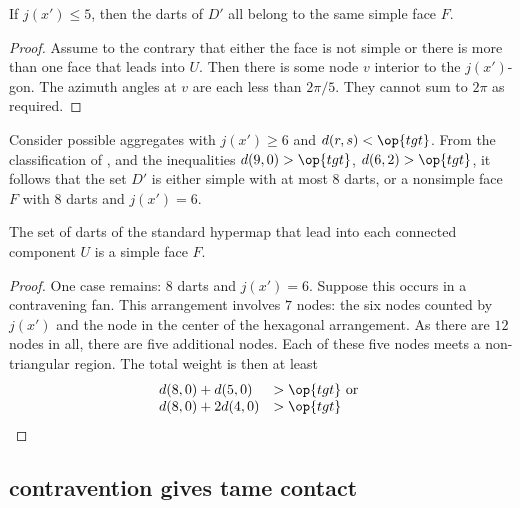 \begin{lemma}[]\label{lemma:DU} If $j(x')\le 5$, then the
  darts of $D'$ all belong to the same simple face $F$.
\end{lemma}
%

\begin{proof} Assume to the contrary that either the face is not
  simple or there is more than one face that leads into $U$.  Then
  there is some node $v$ interior to the $j(x')$-gon.  The azimuth
  angles at $v$ are each less than $2\pi/5$. They cannot sum to $2\pi$
  as required.
\end{proof}

Consider possible aggregates with $j(x')\ge 6$ and $d(r,s)<\op{tgt}$.
From the classification of \cite[p.~126,~Fig.~12.1]{Hales:2006:DCG},
and the inequalities $d(9,0) > \op{tgt}$, $d(6,2) > \op{tgt}$, it
follows that the set $D'$ is either simple with at most $8$ darts, or
a nonsimple face $F$ with $8$ darts and $j(x')=6$.

\begin{lemma}[]\label{lemma:simple} The set of darts of
  the standard hypermap that lead into each connected component $U$ is
  a simple face $F$.
\end{lemma}
%
%

\begin{proof} One case remains: $8$ darts and $j(x')=6$.  Suppose this
  occurs in a contravening fan.  This arrangement involves $7$ nodes:
  the six nodes counted by $j(x')$ and the node in the center of the
  hexagonal arrangement.  As there are $12$ nodes in all, there are
  five additional nodes.  Each of these five nodes meets a
  non-triangular region.  The total weight is then at least
\begin{displaymath}
\begin{array}{lll}
d(8,0) + d(5,0) &> \op{tgt}\hbox{ or }\\
d(8,0) + 2 d(4,0) &> \op{tgt}\\
\end{array}
\end{displaymath}
\end{proof}
%
%








\subsection{contravention gives tame contact}

